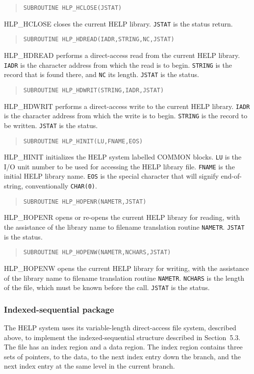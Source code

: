 \begin{verse}
\verb|SUBROUTINE HLP_HCLOSE(JSTAT)|
\end{verse}
HLP\_HCLOSE closes the current HELP library.  \verb|JSTAT| is the
status return.

\begin{verse}
\verb|SUBROUTINE HLP_HDREAD(IADR,STRING,NC,JSTAT)|
\end{verse}
HLP\_HDREAD performs a direct-access read from the current HELP library.
\verb|IADR| is the character address from which the read is to
begin.  \verb|STRING| is the record that is found there, and
\verb|NC| its length.  \verb|JSTAT| is the status.

\begin{verse}
\verb|SUBROUTINE HLP_HDWRIT(STRING,IADR,JSTAT)|
\end{verse}
HLP\_HDWRIT performs a direct-access write to the current HELP library.
\verb|IADR| is the character address from which the write is to begin.
\verb|STRING| is the record to be written.  \verb|JSTAT| is the status.

\begin{verse}
\verb|SUBROUTINE HLP_HINIT(LU,FNAME,EOS)|
\end{verse}
HLP\_HINIT initializes the HELP system labelled COMMON blocks.
\verb|LU| is the I/O unit number to be used for accessing the
HELP library file.  \verb|FNAME| is the initial HELP library name.
\verb|EOS| is the special character that will signify end-of-string,
conventionally \verb|CHAR(0)|.

\begin{verse}
\verb|SUBROUTINE HLP_HOPENR(NAMETR,JSTAT)|
\end{verse}
HLP\_HOPENR opens or re-opens the current HELP library for reading,
with the assistance of the library name to filename translation
routine \verb|NAMETR|.
\verb|JSTAT| is the status.

\begin{verse}
\verb|SUBROUTINE HLP_HOPENW(NAMETR,NCHARS,JSTAT)|
\end{verse}
HLP\_HOPENW opens the current HELP library for writing,
with the assistance of the library name to filename translation
routine \verb|NAMETR|.
\verb|NCHARS|
is the length of the file, which must be known before the call.
\verb|JSTAT| is the status.

\subsubsection{Indexed-sequential package}
The HELP system uses its variable-length direct-access file
system, described above,
to implement the indexed-sequential structure described
in Section~5.3.  The file has an index region and a
data region.  The index region contains three sets of pointers,
to the data, to the next index entry down the branch, and the
next index entry at the same level in the current branch.

